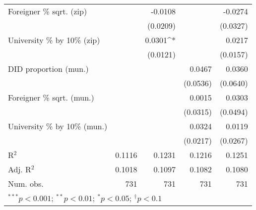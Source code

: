 \begin{tabular}{l D{.}{.}{3.7} D{.}{.}{3.6} D{.}{.}{3.6} D{.}{.}{3.6}}
Foreigner \% sqrt. (zip)          &              & -0.0108     &             & -0.0274     \\
                                  &              & (0.0209)    &             & (0.0327)    \\
University \% by 10\% (zip)       &              & 0.0301^{*}  &             & 0.0217      \\
                                  &              & (0.0121)    &             & (0.0157)    \\
DID proportion (mun.)             &              &             & 0.0467      & 0.0360      \\
                                  &              &             & (0.0536)    & (0.0640)    \\
Foreigner \% sqrt. (mun.)         &              &             & 0.0015      & 0.0303      \\
                                  &              &             & (0.0315)    & (0.0494)    \\
University \% by 10\% (mun.)      &              &             & 0.0324      & 0.0119      \\
                                  &              &             & (0.0217)    & (0.0267)    \\
\midrule
R$^2$                             & 0.1116       & 0.1231      & 0.1216      & 0.1251      \\
Adj. R$^2$                        & 0.1018       & 0.1097      & 0.1082      & 0.1080      \\
Num. obs.                         & 731          & 731         & 731         & 731         \\
\bottomrule
{}
\end{tabular}

